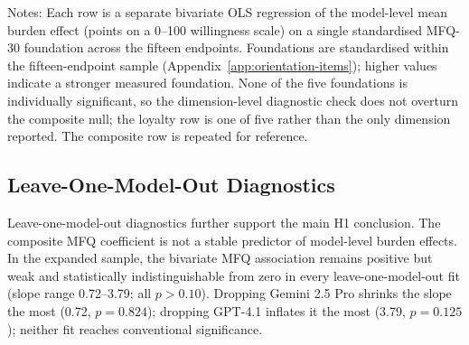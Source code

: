\begin{table}[htbp]
\centering
\caption{Foundation-specific H1 regressions in the fifteen-endpoint sample}
\label{tab:h1_dimension_checks}
\begin{flushleft}
\footnotesize Notes: Each row is a separate bivariate OLS regression of the model-level mean burden effect (points on a 0--100 willingness scale) on a single standardised MFQ-30 foundation across the fifteen endpoints. Foundations are standardised within the fifteen-endpoint sample (Appendix~\ref{app:orientation-items}); higher values indicate a stronger measured foundation. None of the five foundations is individually significant, so the dimension-level diagnostic check does not overturn the composite null; the loyalty row is one of five rather than the only dimension reported. The composite row is repeated for reference.
\end{flushleft}
\end{table}

\subsection{Leave-One-Model-Out Diagnostics}

Leave-one-model-out diagnostics further support the main H1 conclusion. The composite MFQ coefficient is not a stable predictor of model-level burden effects. In the expanded sample, the bivariate MFQ association remains positive but weak and statistically indistinguishable from zero in every leave-one-model-out fit (slope range 0.72--3.79; all \(p > 0.10\)). Dropping Gemini 2.5 Pro shrinks the slope the most (0.72, \(p=0.824\)); dropping GPT-4.1 inflates it the most (3.79, \(p=0.125\)); neither fit reaches conventional significance.

